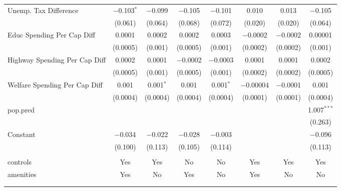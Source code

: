 \begin{table}[!htbp]
\begin{tabular}{@{\extracolsep{5pt}}lccccccc}
  Unemp. Tax Difference & $-$0.103$^{*}$ & $-$0.099 & $-$0.105 & $-$0.101 & 0.010 & 0.013 & $-$0.105 \\ 
  & (0.061) & (0.064) & (0.068) & (0.072) & (0.020) & (0.020) & (0.064) \\ 
  Educ Spending Per Cap Diff & 0.0001 & 0.0002 & 0.0002 & 0.0003 & $-$0.0002 & $-$0.0002 & 0.00001 \\ 
  & (0.0005) & (0.001) & (0.0005) & (0.001) & (0.0002) & (0.0002) & (0.001) \\ 
  Highway Spending Per Cap Diff & 0.0002 & 0.0001 & $-$0.0002 & $-$0.0003 & 0.0001 & 0.0001 & 0.0002 \\ 
  & (0.0005) & (0.001) & (0.0005) & (0.001) & (0.0002) & (0.0002) & (0.0005) \\ 
  Welfare Spending Per Cap Diff & 0.001 & 0.001$^{*}$ & 0.001 & 0.001$^{*}$ & $-$0.00004 & $-$0.0001 & 0.001 \\ 
  & (0.0004) & (0.0004) & (0.0004) & (0.0004) & (0.0001) & (0.0001) & (0.0004) \\ 
  pop.pred &  &  &  &  &  &  & 1.007$^{***}$ \\ 
  &  &  &  &  &  &  & (0.263) \\ 
  Constant & $-$0.034 & $-$0.022 & $-$0.028 & $-$0.003 &  &  & $-$0.096 \\ 
  & (0.100) & (0.113) & (0.105) & (0.114) &  &  & (0.113) \\ 
 \hline \\[-1.8ex] 
controls & Yes & Yes & No & No & Yes & Yes & Yes \\ 
amenities & Yes & No & Yes & No & Yes & No & No \\ 
\hline \\[-1.8ex] 
\hline 
\hline \\[-1.8ex] 
\end{tabular} 
\end{table} 
